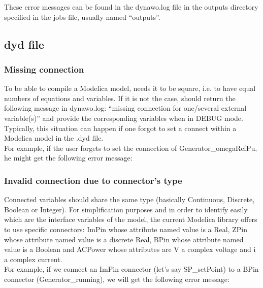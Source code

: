 \documentclass[a4paper, 12pt]{report}
\begin{document}
These error messages can be found in the dynawo.log file in the outputs directory specified in the jobs file, usually named ``outputs''.

\subsection{dyd file}

\subsubsection{Missing connection}

To be able to compile a Modelica model, \Dynawo needs it to be square, i.e. to have equal numbers of equations and variables. If it is not the case, \Dynawo should return the following message in dynawo.log: ``missing connection for one/several external variable(s)'' and provide the corresponding variables when in DEBUG mode. Typically, this situation can happen if one forgot to set a connect within a Modelica model in the .dyd file. \\

For example, if the user forgets to set the connection of Generator\_omegaRefPu, he might get the following error message:



\subsubsection{Invalid connection due to connector's type}

Connected variables should share the same type (basically  Continuous, Discrete, Boolean or Integer). For simplification purposes and in order to identify easily which are the interface variables of the model, the current \Dynawo Modelica library offers to use specific connectors: ImPin whose attribute named value is a Real, ZPin whose attribute named value is a discrete Real, BPin whose attribute named value is a Boolean and ACPower whose attributes are V a complex voltage and i a complex current. \\

For example, if we connect an ImPin connector (let's say SP\_setPoint) to a BPin connector (Generator\_running), we will get the following error message:


\end{document}
